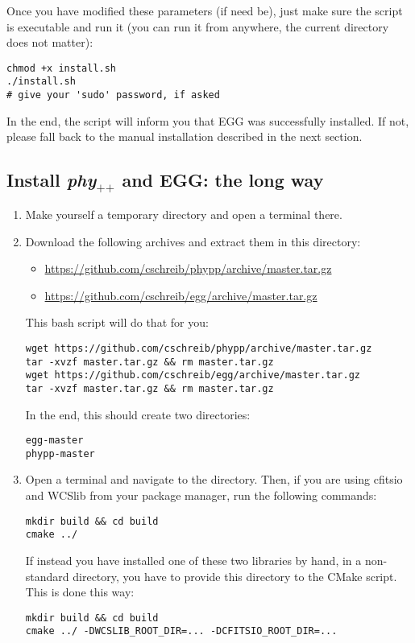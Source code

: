 \documentclass[12pt,a4paper]{article}
\newcommand{\phypp}{\textit{phy}$_{\text{++}}$\xspace}
\newcommand{\egg}{\textsc{EGG}\xspace}
\begin{document}
Once you have modified these parameters (if need be), just make sure the script is executable and run it (you can run it from anywhere, the current directory does not matter):
\begin{verbatim}
chmod +x install.sh
./install.sh
# give your 'sudo' password, if asked
\end{verbatim}

In the end, the script will inform you that \egg was successfully installed. If not, please fall back to the manual installation described in the next section.

\subsection{Install \phypp and \egg: the long way}


\begin{enumerate}
\item Make yourself a temporary directory and open a terminal there.
\item Download the following archives and extract them in this directory:
\begin{itemize}
\item \url{https://github.com/cschreib/phypp/archive/master.tar.gz}
\item \url{https://github.com/cschreib/egg/archive/master.tar.gz}
\end{itemize}

This bash script will do that for you:
\begin{verbatim}
wget https://github.com/cschreib/phypp/archive/master.tar.gz
tar -xvzf master.tar.gz && rm master.tar.gz
wget https://github.com/cschreib/egg/archive/master.tar.gz
tar -xvzf master.tar.gz && rm master.tar.gz
\end{verbatim}

In the end, this should create two directories:
\begin{verbatim}
egg-master
phypp-master
\end{verbatim}

\item Open a terminal and navigate to the  directory. Then, if you are using cfitsio and WCSlib from your package manager, run the following commands:
\begin{verbatim}
mkdir build && cd build
cmake ../
\end{verbatim}

If instead you have installed one of these two libraries by hand, in a non-standard directory, you have to provide this directory to the CMake script. This is done this way:
\begin{verbatim}
mkdir build && cd build
cmake ../ -DWCSLIB_ROOT_DIR=... -DCFITSIO_ROOT_DIR=...
\end{verbatim}


\end{enumerate}
\end{document}

